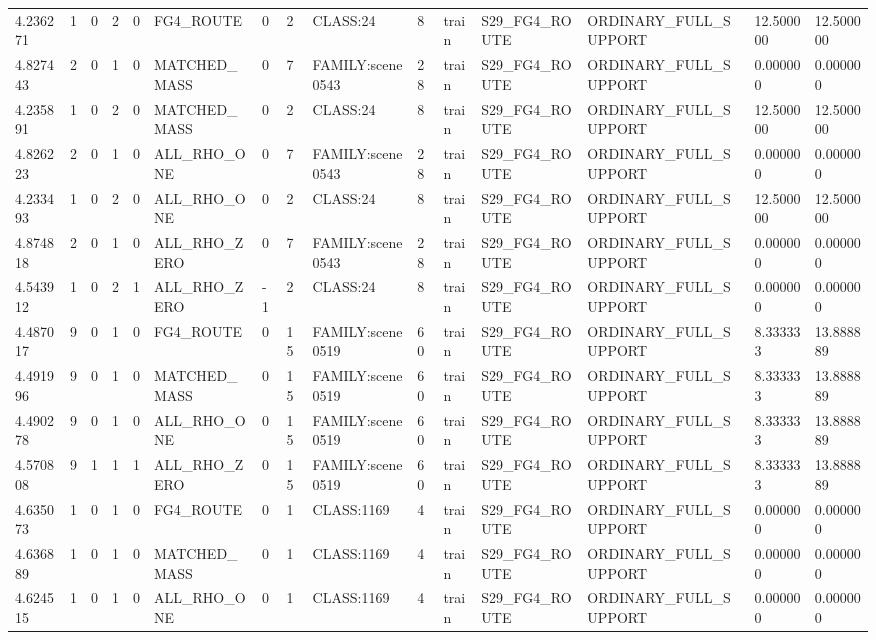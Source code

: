 \begin{tabular}{lllllllllllllll}
4.236271 & 1 & 0 & 2 & 0 & FG4\_ROUTE & 0 & 2 & CLASS:24 & 8 & train & S29\_FG4\_ROUTE & ORDINARY\_FULL\_SUPPORT & 12.500000 & 12.500000 \\
4.827443 & 2 & 0 & 1 & 0 & MATCHED\_MASS & 0 & 7 & FAMILY:scene0543 & 28 & train & S29\_FG4\_ROUTE & ORDINARY\_FULL\_SUPPORT & 0.000000 & 0.000000 \\
4.235891 & 1 & 0 & 2 & 0 & MATCHED\_MASS & 0 & 2 & CLASS:24 & 8 & train & S29\_FG4\_ROUTE & ORDINARY\_FULL\_SUPPORT & 12.500000 & 12.500000 \\
4.826223 & 2 & 0 & 1 & 0 & ALL\_RHO\_ONE & 0 & 7 & FAMILY:scene0543 & 28 & train & S29\_FG4\_ROUTE & ORDINARY\_FULL\_SUPPORT & 0.000000 & 0.000000 \\
4.233493 & 1 & 0 & 2 & 0 & ALL\_RHO\_ONE & 0 & 2 & CLASS:24 & 8 & train & S29\_FG4\_ROUTE & ORDINARY\_FULL\_SUPPORT & 12.500000 & 12.500000 \\
4.874818 & 2 & 0 & 1 & 0 & ALL\_RHO\_ZERO & 0 & 7 & FAMILY:scene0543 & 28 & train & S29\_FG4\_ROUTE & ORDINARY\_FULL\_SUPPORT & 0.000000 & 0.000000 \\
4.543912 & 1 & 0 & 2 & 1 & ALL\_RHO\_ZERO & -1 & 2 & CLASS:24 & 8 & train & S29\_FG4\_ROUTE & ORDINARY\_FULL\_SUPPORT & 0.000000 & 0.000000 \\
4.487017 & 9 & 0 & 1 & 0 & FG4\_ROUTE & 0 & 15 & FAMILY:scene0519 & 60 & train & S29\_FG4\_ROUTE & ORDINARY\_FULL\_SUPPORT & 8.333333 & 13.888889 \\
4.491996 & 9 & 0 & 1 & 0 & MATCHED\_MASS & 0 & 15 & FAMILY:scene0519 & 60 & train & S29\_FG4\_ROUTE & ORDINARY\_FULL\_SUPPORT & 8.333333 & 13.888889 \\
4.490278 & 9 & 0 & 1 & 0 & ALL\_RHO\_ONE & 0 & 15 & FAMILY:scene0519 & 60 & train & S29\_FG4\_ROUTE & ORDINARY\_FULL\_SUPPORT & 8.333333 & 13.888889 \\
4.570808 & 9 & 1 & 1 & 1 & ALL\_RHO\_ZERO & 0 & 15 & FAMILY:scene0519 & 60 & train & S29\_FG4\_ROUTE & ORDINARY\_FULL\_SUPPORT & 8.333333 & 13.888889 \\
4.635073 & 1 & 0 & 1 & 0 & FG4\_ROUTE & 0 & 1 & CLASS:1169 & 4 & train & S29\_FG4\_ROUTE & ORDINARY\_FULL\_SUPPORT & 0.000000 & 0.000000 \\
4.636889 & 1 & 0 & 1 & 0 & MATCHED\_MASS & 0 & 1 & CLASS:1169 & 4 & train & S29\_FG4\_ROUTE & ORDINARY\_FULL\_SUPPORT & 0.000000 & 0.000000 \\
4.624515 & 1 & 0 & 1 & 0 & ALL\_RHO\_ONE & 0 & 1 & CLASS:1169 & 4 & train & S29\_FG4\_ROUTE & ORDINARY\_FULL\_SUPPORT & 0.000000 & 0.000000 \\

\end{tabular}
